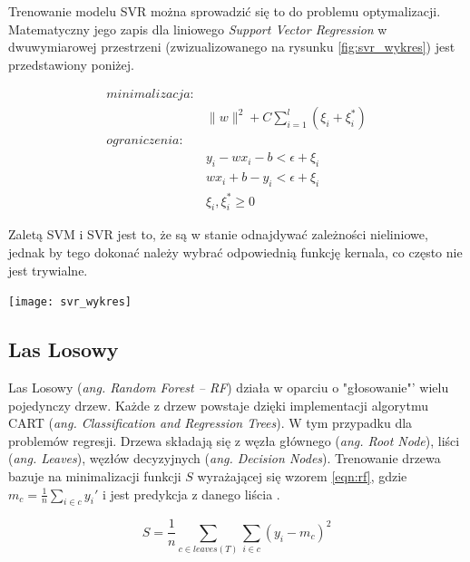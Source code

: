Trenowanie modelu SVR można sprowadzić się to do problemu optymalizacji. Matematyczny jego zapis dla liniowego \emph{Support Vector Regression} w dwuwymiarowej przestrzeni (zwizualizowanego na rysunku \ref{fig:svr_wykres}) jest przedstawiony poniżej. 

\begin{equation*}
\begin{aligned}
\mathit{minimalizacja:} \\&\parallel w \parallel^{2} +C\sum_{i=1}^{l} (\xi_{i} + \xi_{i}^{*}) \\
\mathit{ograniczenia:} \\ 
&y_{i} -  wx_{i} -b < \epsilon +\xi_{i} 
\\&  wx_{i} + b -y_{i} < \epsilon +\xi_{i}
\\&\xi_{i},\xi_{i}^{*}\geq 0
\end{aligned}
\label{eqn:svr}
\end{equation*}

Zaletą SVM i SVR jest to, że są w stanie odnajdywać zależności nieliniowe, jednak by tego dokonać należy wybrać odpowiednią funkcję kernala, co często nie jest trywialne.

\begin{center}
	\texttt{[image: svr\_wykres]}
	\label{fig:svr_wykres}
	\label{fig:xccs}
\end{center}

\subsection{Las Losowy}
Las Losowy (\emph{ang. Random Forest -- RF}) działa w oparciu o "głosowanie"' wielu pojedynczy drzew. Każde z drzew powstaje dzięki implementacji algorytmu CART ({\em ang. Classification and Regression Trees}). W tym przypadku dla problemów regresji. Drzewa składają się z węzła głównego ({\em ang. Root Node}), liści ({\em ang. Leaves}), węzłów decyzyjnych ({\em ang. Decision Nodes}). Trenowanie drzewa bazuje na minimalizacji funkcji $S$ wyrażającej się wzorem \ref{eqn:rf}, gdzie $m_c=\frac{1}{n}\sum_{i \in c}y_i'$ i jest predykcja z danego liścia \cite{rf}. 

\begin{equation}
\label{eqn:rf}
S=\frac{1}{n}\sum_{c \in leaves(T)}\sum_{i \in c}(y_i - m_c)^2
\end{equation}

